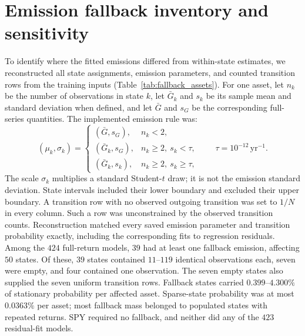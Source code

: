 \begin{table}[H]
  \centering
  \caption{\textbf{Pooled-threshold coverage on the common holdout
    assets.} All methods use the same $386$ assets. Each threshold
    pools $5{,}000$ separate $249$-day paths, as in
    Table~\ref{tab:var}. Rate denotes the mean per-asset exceedance
    percentage on observed $2025$ returns. Standard deviation (SD)
    describes cross-asset dispersion in percentage points.
    SIM denotes the single-index model; JumpHMM denotes the hidden
    Markov generator with jumps disabled; GARCH denotes generalized
    autoregressive conditional heteroskedasticity.}
  \label{tab:var_common}
  \footnotesize
  \setlength{\tabcolsep}{4pt}
  
\end{table}


\section{Emission fallback inventory and sensitivity}
\label{sec:supp-fallback}

To identify where the fitted emissions differed from within-state
estimates, we reconstructed all state assignments, emission
parameters, and counted transition rows from the training inputs
(Table~\ref{tab:fallback_assets}). For one asset, let $n_k$ be the
number of observations in state $k$, let $\bar G_k$ and $s_k$ be
its sample mean and standard deviation when defined, and let
$\bar G$ and $s_G$ be the corresponding full-series quantities.
The implemented emission rule was:
\begin{equation}
 (\mu_k,\sigma_k)=
 \begin{cases}
   (\bar G,s_G), & n_k<2,\\
   (\bar G_k,s_G), & n_k\ge2,\ s_k<\tau,\\
   (\bar G_k,s_k), & n_k\ge2,\ s_k\ge\tau,
 \end{cases}
 \qquad \tau=10^{-12}\,\mathrm{yr}^{-1}.
 \label{eq:emission-fallback}
\end{equation}
The scale $\sigma_k$ multiplies a standard Student-$t$ draw; it is
not the emission standard deviation. State intervals included their
lower boundary and excluded their upper boundary. A transition row
with no observed outgoing transition was set to $1/N$ in every
column. Such a row was unconstrained by the observed transition
counts. Reconstruction matched every saved emission parameter and
transition probability exactly, including the corresponding fits to
regression residuals. Among the $424$ full-return models, $39$ had
at least one fallback emission, affecting $50$ states. Of these,
$39$ states contained $11$--$119$ identical observations each,
seven were empty, and four contained one observation. The seven
empty states also supplied the seven uniform transition rows.
Fallback states carried $0.399$--$4.300\%$ of stationary probability
per affected asset. Sparse-state probability was at most $0.0363\%$
per asset; most fallback mass belonged to populated states with
repeated returns. SPY required no fallback, and neither did any of
the $423$ residual-fit models.

